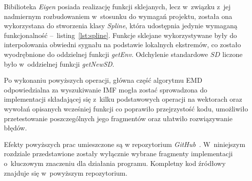 Bibilioteka \textit{Eigen} posiada realizację funkcji sklejanych, lecz w~związku
z~jej nadmiernym rozbudowaniem w~stosunku do wymagań projektu, została ona
wykorzystana do stworzenia klasy \textit{Spline}, która udostępnia jedynie
wymaganą funkcjonalność --~listing~\ref{lst:spline}. Funkcje sklejane
wykorzystywane były do interpolowania obwiedni sygnału na podstawie lokalnych
ekstremów, co zostało wyodrębnione do oddzielnej funkcji \textit{getEnv}.
Odchylenie standardowe $SD$ liczone było w~oddzielnej funkcji \textit{getNewSD}.

Po wykonaniu powyższych operacji, główna część algorytmu EMD odpowiedzialna za
wyszukiwanie IMF mogła zostać sprowadzona do implementacji składającej się
z~kilku podstawowych operacji na wektorach oraz wywołań opisanych wcześniej
funkcji co poprawiło przejrzystość kodu, umożliwiło przetestowanie
poszczególnych jego fragmentów oraz ułatwiło rozwiązywanie błędów.

Efekty powyższych prac umieszczone są w repozytorium \textit{GitHub}~\cite{GIT}.
W~niniejszym rozdziale przedstawione zostały wyłącznie wybrane fragmenty
implementacji o~kluczowym znaczeniu dla działania programu. Kompletny kod
źródłowy znajduje się w~powyższym repozytorium.